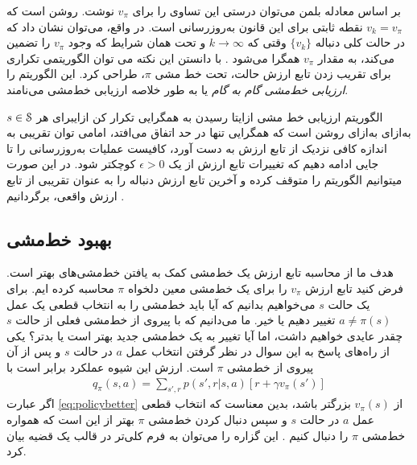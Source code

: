 بر اساس معادله بلمن می‌توان درستی این تساوی را برای 
$v_{\pi}$
نوشت. روشن است که 
 $v_k = v_{\pi}$
 نقطه ثابتی برای این قانون به‌روز‌رسانی است.
 در واقع، می‌توان نشان داد که در حالت کلی دنباله 
 $\{ v_k \}$
وقتی که 
$ k \rightarrow \infty $
و تحت همان شرایط که وجود 
$v_{\pi}$
را تضمین می‌کند، به مقدار 
$v_{\pi}$
همگرا می‌شود \cite{suttonbook}. با دانستن این نکته می توان الگوریتمی تکراری برای  تقریب زدن تابع ارزش حالت، تحت خط مشی $\pi$، طراحی کرد. این الگوریتم را 
\textit{ارزیابی خط‌مشی گام به گام}
 یا به طور خلاصه 
ارزیابی خط‌مشی
 می‌نامند.


{الگوریتم ارزیابی خط مشی}
‌ازای{تا رسیدن به همگرایی تکرار کن}
‌ازای{برای هر $s \in \EuScript{S}$}
‌به‌ازای
‌به‌ازای
روشن است که همگرایی تنها در حد اتفاق می‌افتد، اما\nf می توان تقریبی به اندازه کافی نزدیک از تابع ارزش به دست آورد، کافیست عملیات به‌روزرسانی را تا جایی ادامه دهیم که تغییرات تابع ارزش از یک
$\epsilon > 0$
کوچکتر شود. در این صورت می\nf توانیم الگوریتم را متوقف کرده و آخرین تابع ارزش دنباله را به عنوان تقریبی از تابع ارزش واقعی، برگردانیم \cite{suttonbook}.
% 
%
\subsection{بهبود خط‌مشی}
هدف ما از محاسبه تابع ارزش یک خط‌مشی کمک به یافتن خط‌مشی‌های بهتر است.
فرض کنید تابع ارزش 
$v_{\pi}$
 را برای یک خط‌مشی معین  دلخواه 
 $\pi$
  محاسبه کرده ایم. برای یک حالت 
  $s$
 می‌خواهیم بدانیم که آیا باید خط‌مشی را به انتخاب قطعی یک عمل 
 $a \neq \pi(s)$
  تغییر دهیم یا خیر.
ما می‌دانیم که با پیروی از خط‌مشی فعلی از حالت
 $s$
  چقدر عایدی خواهیم داشت، اما آیا تغییر به یک خط‌مشی جدید بهتر است یا بدتر؟
  یکی از راه‌های پاسخ به این سوال در نظر گرفتن انتخاب عمل  
  $a$
در حالت 
$s$
و پس از آن پیروی از خط‌مشی
$\pi$
 است. 
 ارزش این شیوه عملکرد برابر است با
 \begin{align}
q_\pi(s,a) = \sum_{s',r} p(s',r|s,a)\left[r + \gamma v_\pi(s')\right]	
 	\label{eq:policybetter}
 \end{align}
 اگر عبارت 
 \ref{eq:policybetter}
 از $v_\pi(s)$ بزرگتر باشد، بدین معناست که انتخاب قطعی عمل $a$ در حالت $s$ و سپس دنبال کردن خط‌مشی $\pi$ بهتر از این است که همواره خط‌مشی $\pi$ را دنبال کنیم \cite{suttonbook}. این گزاره را می‌توان به فرم کلی‌تر در قالب یک قضیه بیان کرد.

